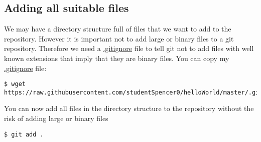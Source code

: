 \subsection{Adding all suitable files}

We may have a directory structure full of files that we want to add
to the repository. However it is important not to add large or binary
files to a git repository. Therefore we need a \url{.gitignore} file
to tell git not to add files with well known extensions that imply
that they are binary files. You can copy my \url{.gitignore} file:

\begin{lstlisting}[basicstyle=\scriptsize]
$ wget https://raw.githubusercontent.com/studentSpencer0/helloWorld/master/.gitignore
\end{lstlisting}

You can now add all files in the directory structure to the repository
without the risk of adding large or binary files
\begin{lstlisting}
$ git add .
\end{lstlisting}
\clearpage{}


